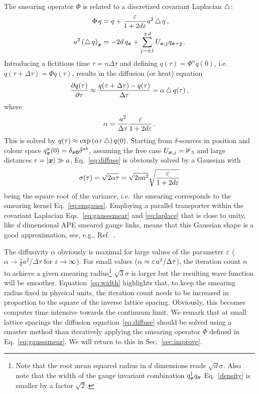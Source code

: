 The smearing operator $\Phi$ is related to a
discretized covariant Laplacian $\mathop{{}\bigtriangleup}\nolimits$:
\begin{align}
\Phi\,q&=q+\frac{\varepsilon}{1+2d\varepsilon}a^2\mathop{{}\bigtriangleup}\nolimits q\,,\\
a^2\left(\mathop{{}\bigtriangleup}\nolimits q\right)_{\boldsymbol{x}}
&=-2d\, q_{\boldsymbol{x}}+\sum_{j=\pm 1}^{\pm d} U_{\boldsymbol{x},j} q_{\boldsymbol{x}+\hat{\boldsymbol{\jmath}}}\,.\label{eq:laplace}
\end{align}
Introducing a fictitious time $\tau=n\Delta\tau$ and defining
$q(\tau)=\Phi^nq(0)$, i.e.\ $q(\tau+\Delta\tau)=\Phi q(\tau)$,
results in the diffusion (or heat) equation
\begin{equation}
\frac{\partial q(\tau)}{\partial\tau}\approx
\frac{q(\tau+\Delta\tau)-q(\tau)}{\Delta\tau}=\alpha\mathop{{}\bigtriangleup}\nolimits q(\tau)\,,\label{eq:diffuse}
\end{equation}
where
\begin{equation}
\alpha=\frac{a^2}{\Delta\tau}\frac{\varepsilon}{1+2d\varepsilon}\,.
\label{eq:alphadef}
\end{equation}
This is solved by $q(\tau)\approx \exp\left(\alpha\tau\mathop{{}\bigtriangleup}\nolimits\right)q(0)$.
Starting from $\delta$-sources in position and colour space
$q_{\boldsymbol{x}}^a(0)=\delta_{\boldsymbol{x}\boldsymbol{0}}\delta^{ab}$,
assuming the free case $U_{\boldsymbol{x},j}=\mathbb{1}_3$
and large distances $r=|\boldsymbol{x}|\gg a$, Eq.~\eqref{eq:diffuse}
is obviously solved by a Gaussian with
\begin{equation}
\sigma(\tau)=\sqrt{2\alpha\tau}=\sqrt{2na^2}\sqrt{\frac{\varepsilon}{1+2d\varepsilon}}\label{eq:width}
\end{equation}
being the square root of the variance,
i.e.\ the smearing corresponds to the smearing kernel Eq.~\eqref{eq:smgauss}.
Employing a parallel transporter within the covariant Laplacian
Eqs.~\eqref{eq:gausssmear} and \eqref{eq:laplace}
that is close to unity, like
$d$ dimensional APE smeared gauge links,
means that this
Gaussian shape is a good approximation, see, e.g., Ref.~\cite{Bali:2011rd}.

The diffusivity $\alpha$ obviously is maximal for large values of the
parameter $\varepsilon$
($\alpha\rightarrow \frac16 a^2/\Delta\tau$ for $\varepsilon\rightarrow\infty$).
For small values ($\alpha\approx \varepsilon\, a^2/\Delta\tau$),
the iteration count
$n$ to achieve a given smearing radius\footnote{Note that the root mean
squared radius in $d$ dimensions reads
$\sqrt{d}\sigma$. Also
note that the width of the gauge invariant combination
$q^{\dagger}_{\boldsymbol{x}}q_{\boldsymbol{x}}$ Eq.~\eqref{density}
is smaller by a factor $\sqrt{2}$.}
$\sqrt{3}\sigma$ is larger but the
resulting wave function will be smoother. Equation~\eqref{eq:width}
highlights that, to keep the smearing radius fixed in physical
units, the iteration
count needs to be increased in proportion to the square of the
inverse lattice spacing. Obviously,
this becomes computer time intensive towards the
continuum limit. We remark that at small lattice spacings
the diffusion equation~\eqref{eq:diffuse} should be
solved using a smarter method than iteratively applying the smearing operator
$\Phi$ defined in Eq.~\eqref{eq:gausssmear}. We will return to this
in Sec.~\ref{sec:improve}.

